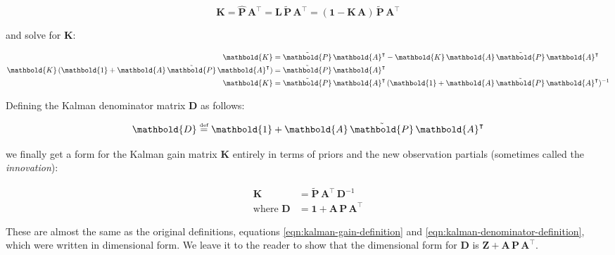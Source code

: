 \documentclass[10pt,oneside,x11names]{article}
\begin{document}
\begin{equation*}
\mathbold{K}
=
\hat{\mathbold{P}}\,
\mathbold{A}^\intercal
=
\mathbold{L}\,
\tilde{\mathbold{P}}\,
\mathbold{A}^\intercal
=
(\mathbold{1}-
\mathbold{K}\,
\mathbold{A})\,
\tilde{\mathbold{P}}\,
\mathbold{A}^\intercal
\end{equation*}

\noindent and solve for \(\mathbold{K}\):

\begin{align}
\notag
\mathbold{K}
&=
\tilde{\mathbold{P}}\,
\mathbold{A}^\intercal
-
\mathbold{K}\,
\mathbold{A}\,
\tilde{\mathbold{P}}\,
\mathbold{A}^\intercal
\\
\notag
\mathbold{K}\,
(\mathbold{1}+
\mathbold{A}\,
\tilde{\mathbold{P}}\,
\mathbold{A}^\intercal)
&=
\tilde{\mathbold{P}}\,
\mathbold{A}^\intercal
\\
\label{eqn:for-k}
\mathbold{K}
&=
\tilde{\mathbold{P}}\,
\mathbold{A}^\intercal\,
(\mathbold{1}+
\mathbold{A}\,
\tilde{\mathbold{P}}\,
\mathbold{A}^\intercal)^{-1}
\end{align}

Defining the Kalman denominator matrix \(\mathbold{D}\) as follows:

\begin{equation}
\label{eqn:definition-of-d}
\mathbold{D}
\stackrel{\text{\tiny def}}{=}
\mathbold{1}+
\mathbold{A}\,
\tilde{\mathbold{P}}\,
\mathbold{A}^\intercal
\end{equation}

\noindent we finally get a form for the Kalman gain matrix \(\mathbold{K}\)
entirely in terms of priors and the new observation partials (sometimes called
the \emph{innovation}):

\begin{align}
\label{eqn:kalman-gain-definition-2}
\mathbold{K}
&=
\tilde{\mathbold{P}}\,
\mathbold{A}^\intercal\,
\mathbold{D}^{-1} 
\\
\label{eqn:kalman-denominator-definition-2}
\text{where }
\mathbold{D}
&= \mathbold{1} +
\mathbold{A}\,
\mathbold{P}\,
\mathbold{A}^\intercal
\end{align}

\noindent These are almost the same as the original definitions, equations
\ref{eqn:kalman-gain-definition} and \ref{eqn:kalman-denominator-definition},
which were written in dimensional form. We leave it to the reader to show that
the dimensional form for \(\mathbold{D}\) is
\(\mathbold{Z}+
\mathbold{A}\,
\mathbold{P}\,
\mathbold{A}^\intercal\).
\end{document}

